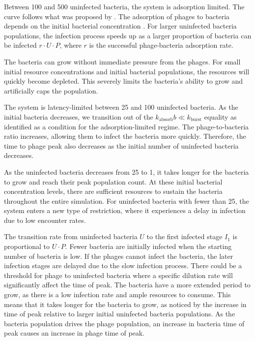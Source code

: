 Between 100 and 500 uninfected bacteria, the system is adsorption limited.
The curve follows what was proposed by \citet{mullaExtremeDiversityPhage2024}. 
The adsorption of phages to bacteria depends on the initial bacterial concentration \cite{mullaExtremeDiversityPhage2024}. 
For larger uninfected bacteria populations, the infection process speeds up as a larger proportion of bacteria can be infected $r\cdot U\cdot P$, where $r$ is the successful phage-bacteria adsorption rate. 

The bacteria can grow without immediate pressure from the phages. 
For small initial resource concentrations and initial bacterial populations, the resources will quickly become depleted. 
This severely limits the bacteria’s ability to grow and artificially caps the population. 

The system is latency-limited between 25 and 100 uninfected bacteria. 
As the initial bacteria decreases, we transition out of the $k_{\text{absorb}}b \ll k_{\text{burst}}$ equality as identified as a condition for the adsorption-limited regime. 
The phage-to-bacteria ratio increases, allowing them to infect the bacteria more quickly. 
Therefore, the time to phage peak also decreases as the initial number of uninfected bacteria decreases. 

As the uninfected bacteria decreases from 25 to 1, it takes longer for the bacteria to grow and reach their peak population count. 
At these initial bacterial concentration levels, there are sufficient resources to sustain the bacteria throughout the entire simulation. 
For uninfected bacteria with fewer than 25, the system enters a new type of restriction, where it experiences a delay in infection due to low encounter rates. 

The transition rate from uninfected bacteria $U$ to the first infected stage $I_1$ is proportional to $U\cdot P$. 
Fewer bacteria are initially infected when the starting number of bacteria is low. 
If the phages cannot infect the bacteria, the later infection stages are delayed due to the slow infection process. 
There could be a threshold for phage to uninfected bacteria where a specific dilution rate will significantly affect the time of peak. 
The bacteria have a more extended period to grow, as there is a low infection rate and ample resources to consume. 
This means that it takes longer for the bacteria to grow, as noticed by the increase in time of peak relative to larger initial uninfected bacteria populations. 
As the bacteria population drives the phage population, an increase in bacteria time of peak causes an increase in phage time of peak. 


